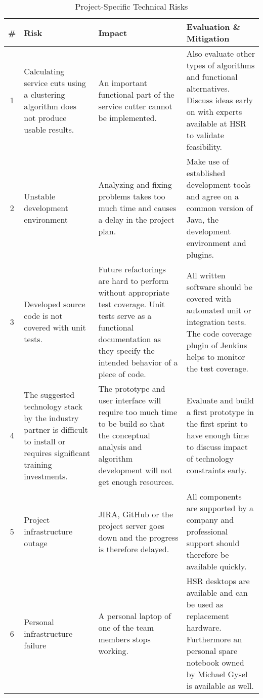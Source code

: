 \begin{table}[H]
\begin{tabular}{|c|p{80pt} p{140pt} p{140pt}|}
	\hline \# & Risk & Impact & Evaluation \& Mitigation \\ 
	\hline 1 & Calculating service cuts using a clustering algorithm does not produce usable results. & An important functional part of the service cutter cannot be implemented. & Also evaluate other types of algorithms and functional alternatives. Discuss ideas early on with experts available at \gls{HSR} to validate feasibility. \\ 
	2 & Unstable development environment & Analyzing and fixing problems takes too much time and causes a delay in the project plan. & Make use of established development tools and agree on a common version of Java, the development environment and plugins. \\
	3 & Developed source code is not covered with unit tests. & Future refactorings are hard to perform without appropriate test coverage. Unit tests serve as a functional documentation as they specify the intended behavior of a piece of code. & All written software should be covered with automated unit or integration tests. The code coverage plugin of Jenkins helps to monitor the test coverage. \\
	4 & The suggested technology stack by the industry partner is difficult to install or requires significant training investments. & The prototype and user interface will require too much time to be build so that the conceptual analysis and algorithm development will not get enough resources. & Evaluate and build a first prototype in the first sprint to have enough time to discuss impact of technology constraints early.\\
	5 & Project infrastructure outage & JIRA, GitHub or the project server goes down and the progress is therefore delayed.  & All components are supported by a company and professional support should therefore be available quickly.  \\ 
	6 & Personal infrastructure failure & A personal laptop of one of the team members stops working. & HSR desktops are available and can be used as replacement hardware. Furthermore an personal spare notebook owned by Michael Gysel is available as well.  \\ 

	\hline
\end{tabular}
\caption{Project-Specific Technical Risks}
\label{tab:projtechnicalrisks}
\end{table}

